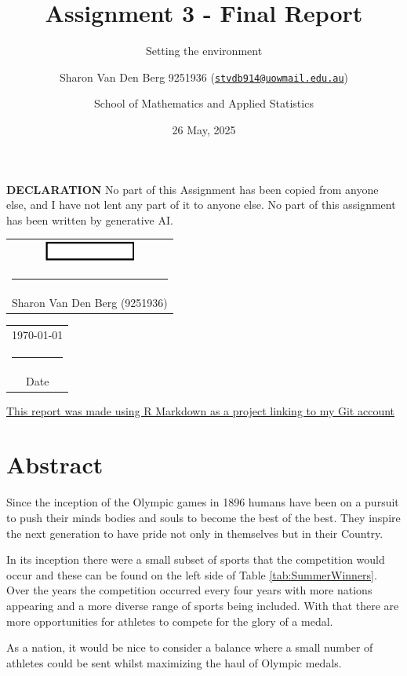 \documentclass[
]{article}
\title{Assignment 3 - Final Report}
\subtitle{Setting the environment}
\author{Sharon Van Den Berg 9251936 (\href{mailto:stvdb914@uowmail.edu.au}{\nolinkurl{stvdb914@uowmail.edu.au}}) \and School of Mathematics and Applied Statistics}
\date{26 May, 2025}
\begin{document}
\maketitle

\textbf{DECLARATION}
No part of this Assignment has been copied from anyone else, and I have not lent any part of it to anyone else. No part of this assignment has been written by generative AI.

    \vspace*{2em}\noindent
    \hfill%
    \begin{tabular}[t]{c}
        \includegraphics[width=3cm]{../images/Sharon.png} \\
        \rule{10em}{0.5pt}\\ Sharon Van Den Berg (9251936)
    \end{tabular}%
    \hfill%
    \begin{tabular}[t]{c}
        \today \\
        \rule{10em}{0.4pt}\\ Date
    \end{tabular}

\href{https://github.com/stvdb914/DSAA811-Final-Report}{This report was made using R Markdown as a project linking to my Git account}

\newpage

\section*{Abstract}\label{abstract}

Since the inception of the Olympic games in 1896 humans have been on a pursuit to push their minds bodies and souls to become the best of the best. They inspire the next generation to have pride not only in themselves but in their Country.

In its inception there were a small subset of sports that the competition would occur and these can be found on the left side of Table \ref{tab:SummerWinners}. Over the years the competition occurred every four years with more nations appearing and a more diverse range of sports being included. With that there are more opportunities for athletes to compete for the glory of a medal.

As a nation, it would be nice to consider a balance where a small number of athletes could be sent whilst maximizing the haul of Olympic medals.
\end{document}
